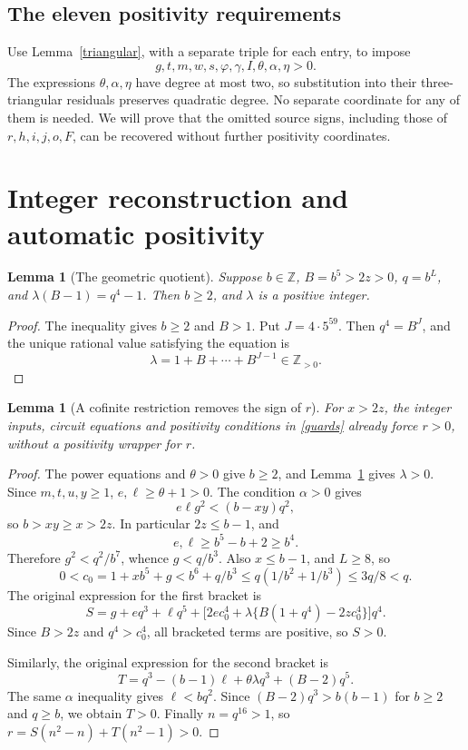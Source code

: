 \documentclass[11pt]{article}
\newtheorem{lemma}[theorem]{Lemma}
\newcommand{\Z}{\mathbb Z}
\newcommand{\Np}{\mathbb Z_{>0}}
\begin{document}
\subsection{The eleven positivity requirements}
Use Lemma~\ref{triangular}, with a separate triple for each entry, to
impose
\begin{equation}\label{guards}
 g,t,m,w,s,\varphi,\gamma,I,\theta,\alpha,\eta>0.
\end{equation}
The expressions \(\theta,\alpha,\eta\) have degree at most two, so
substitution into their three-triangular residuals preserves quadratic
degree. No separate coordinate for any of them is needed. We will prove
that the omitted source signs, including those of \(r,h,i,j,o,F\), can
be recovered without further positivity coordinates.

\section{Integer reconstruction and automatic positivity}
\begin{lemma}[The geometric quotient]\label{lambda}
Suppose \(b\in\Z\), \(B=b^5>2z>0\), \(q=b^L\), and
\(\lambda(B-1)=q^4-1\). Then \(b\ge2\), and \(\lambda\) is a
positive integer.
\end{lemma}
\begin{proof}
The inequality gives \(b\ge2\) and \(B>1\). Put
\(J=4\cdot5^{59}\). Then \(q^4=B^J\), and the unique rational
value satisfying the equation is
\[
 \lambda=1+B+\cdots+B^{J-1}\in\Np.
\]
\end{proof}

\begin{lemma}[A cofinite restriction removes the sign of \(r\)]
\label{rpositive}
For \(x>2z\), the integer inputs, circuit equations and positivity
conditions in \eqref{guards} already force \(r>0\), without a
positivity wrapper for \(r\).
\end{lemma}
\begin{proof}
The power equations and \(\theta>0\) give \(b\ge2\), and
Lemma~\ref{lambda} gives \(\lambda>0\). Since \(m,t,u,y\ge1\),
\(e,\ell\ge\theta+1>0\). The condition \(\alpha>0\) gives
\[
 e\ell g^2<(b-xy)q^2,
\]
so \(b>xy\ge x>2z\). In particular \(2z\le b-1\), and
\[
 e,\ell\ge b^5-b+2\ge b^4.
\]
Therefore \(g^2<q^2/b^7\), whence \(g<q/b^3\). Also
\(x\le b-1\), and \(L\ge8\), so
\[
 0<c_0=1+xb^5+g<b^6+q/b^3
       \le q(1/b^2+1/b^3)\le 3q/8<q.
\]
The original expression for the first bracket is
\[
 S=g+eq^3+\ell q^5+
 \bigl[2ec_0^4+\lambda\{B(1+q^4)-2zc_0^4\}\bigr]q^4.
\]
Since \(B>2z\) and \(q^4>c_0^4\), all bracketed terms are positive,
so \(S>0\).

Similarly, the original expression for the second bracket is
\[
 T=q^3-(b-1)\ell+\theta\lambda q^3+(B-2)q^5.
\]
The same \(\alpha\) inequality gives \(\ell<bq^2\). Since
\((B-2)q^3>b(b-1)\) for \(b\ge2\) and \(q\ge b\), we obtain
\(T>0\). Finally \(n=q^{16}>1\), so
\(r=S(n^2-n)+T(n^2-1)>0\).
\end{proof}
\end{document}
